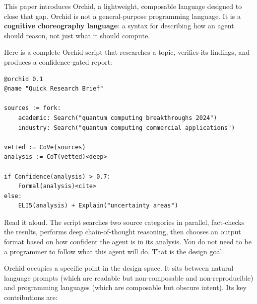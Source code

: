 \documentclass[11pt,a4paper]{article}
\begin{document}
This paper introduces Orchid, a lightweight, composable language designed to close that gap. Orchid is not a general-purpose programming language. It is a \textbf{cognitive choreography language}: a syntax for describing how an agent should reason, not just what it should compute.

Here is a complete Orchid script that researches a topic, verifies its findings, and produces a confidence-gated report:

\begin{lstlisting}[language=orchid]
@orchid 0.1
@name "Quick Research Brief"

sources := fork:
    academic: Search("quantum computing breakthroughs 2024")
    industry: Search("quantum computing commercial applications")

vetted := CoVe(sources)
analysis := CoT(vetted)<deep>

if Confidence(analysis) > 0.7:
    Formal(analysis)<cite>
else:
    ELI5(analysis) + Explain("uncertainty areas")
\end{lstlisting}

Read it aloud. The script searches two source categories in parallel, fact-checks the results, performs deep chain-of-thought reasoning, then chooses an output format based on how confident the agent is in its analysis. You do not need to be a programmer to follow what this agent will do. That is the design goal.

Orchid occupies a specific point in the design space. It sits between natural language prompts (which are readable but non-composable and non-reproducible) and programming languages (which are composable but obscure intent). Its key contributions are:
\end{document}
